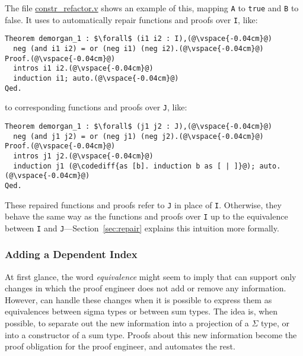 The file \href{https://github.com/uwplse/pumpkin-pi/blob/master/plugin/coq/playground/constr_refactor.v}{constr_refactor.v}
shows an example of this, mapping \lstinline{A} to \lstinline{true} and \lstinline{B} to false.
It uses \toolname to automatically repair functions and proofs over \lstinline{I}, like:

\begin{lstlisting}
Theorem demorgan_1 : $\forall$ (i1 i2 : I),(@\vspace{-0.04cm}@)
  neg (and i1 i2) = or (neg i1) (neg i2).(@\vspace{-0.04cm}@)
Proof.(@\vspace{-0.04cm}@)
  intros i1 i2.(@\vspace{-0.04cm}@)
  induction i1; auto.(@\vspace{-0.04cm}@)
Qed.
\end{lstlisting}
to corresponding functions and proofs over \lstinline{J}, like:

\begin{lstlisting}[backgroundcolor=\color{cyan!30}]
Theorem demorgan_1 : $\forall$ (j1 j2 : J),(@\vspace{-0.04cm}@)
  neg (and j1 j2) = or (neg j1) (neg j2).(@\vspace{-0.04cm}@)
Proof.(@\vspace{-0.04cm}@)
  intros j1 j2.(@\vspace{-0.04cm}@)
  induction j1 (@\codediff{as [b]. induction b as [ | ]}@); auto.(@\vspace{-0.04cm}@)
Qed.
\end{lstlisting}
These repaired functions and proofs refer to \lstinline{J} in place of \lstinline{I}.
Otherwise, they behave the same way as the functions and proofs over \lstinline{I} up to the equivalence between
\lstinline{I} and \lstinline{J}---Section~\ref{sec:repair} explains this intuition more formally.

\subsubsection{Adding a Dependent Index}
\label{sec:ex2}

At first glance, the word \textit{equivalence} might seem to imply that \toolname can support only changes in
which the proof engineer does not add or remove any information.
However, \toolname can handle these changes when it is possible to express them as equivalences between
sigma types or between sum types.
The idea is, when possible, to separate out the new information
into a projection of a $\Sigma$ type, or into a constructor of a sum type.
Proofs about this new information become the proof obligation for the proof engineer,
and \toolname automates the rest.

